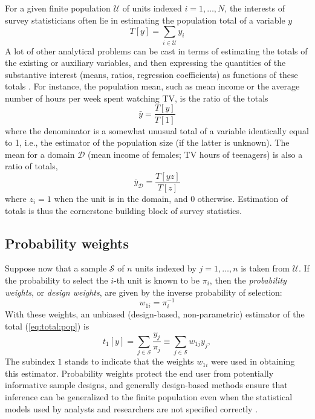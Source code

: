 For a given finite population $\mathcal U$ of units indexed $i=1,\ldots,N$,
the interests of survey statisticians often lie in estimating the
population total of a variable $y$
\begin{equation}
   T[y] = \sum_{i \in \mathcal{U}} y_i
   \label{eq:total:pop}
\end{equation}
A lot of other analytical problems can be cast in terms of estimating
the totals of the existing or auxiliary variables, and then expressing
the quantities of the substantive interest (means, ratios, regression
coefficients) as functions of these totals \citep{skinner:1989}. 
For instance, the population mean,
such as mean income or 
the average number of hours per week spent watching TV,
is the ratio of the totals
$$
    \bar y = \frac{T[y]}{T[1]}
$$
where the denominator is a somewhat unusual total of a variable
identically equal to 1, i.e., the estimator of the population size
(if the latter is unknown). The mean for a domain $\mathcal{D}$ 
(mean income of females; TV hours of teenagers) is also a ratio of totals,
$$
    \bar y_\mathcal{D} = \frac{T[yz]}{T[z]}
$$
where $z_i=1$ when the unit is in the domain, and 0 otherwise.
Estimation of totals is thus the cornerstone building block of survey
statistics.

\subsection{Probability weights}

Suppose now that a sample $\mathcal S$ of $n$ units indexed by $j=1,\ldots,n$
is taken from $\mathcal U$. If the probability to select the
$i$-th unit is known to be $\pi_i$, then
the {\it probability weights}, or {\it design weights}, are given by
the inverse probability of selection:
\begin{equation}
   w_{1i} = \pi_i^{-1}
   \label{eq:prob:weight}
\end{equation}
With these weights, an unbiased
(design-based, non-parametric) estimator
of the total (\ref{eq:total:pop}) is \citep{horvitz:thompson:1952}
\begin{equation}
   t_{1}[y] = \sum_{j \in \mathcal{S}} \frac{y_j}{\pi_j}
   \equiv \sum_{j \in \mathcal{S}} w_{1j} y_j
   \label{eq:total:sample},
\end{equation}
The subindex $1$ stands to indicate that the weights $w_{1i}$ were
used in obtaining this estimator. Probability weights protect
the end user from potentially informative sample designs, and generally
design-based methods ensure that inference can be generalized
to the finite population even when the statistical models used
by analysts and researchers are not specified correctly
\citep{pfeff:1993,binder:roberts:2003}.

